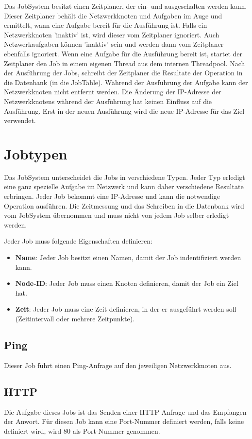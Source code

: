 \documentclass[12pt,a4paper]{report}
\begin{document}
Das JobSystem besitzt einen Zeitplaner, der ein- und ausgeschalten werden kann. Dieser Zeitplaner behält die Netzwerkknoten und Aufgaben im Auge und ermittelt, wann eine Aufgabe bereit für die Ausführung ist. Falls ein Netzwerkknoten 'inaktiv' ist, wird dieser vom Zeitplaner ignoriert. Auch Netzwerkaufgaben können 'inaktiv' sein und werden dann vom Zeitplaner ebenfalls ignoriert. Wenn eine Aufgabe für die Ausführung bereit ist, startet der Zeitplaner den Job in einem eigenen Thread aus dem internen Threadpool. Nach der Ausführung der Jobs, schreibt der Zeitplaner die Resultate der Operation in die Datenbank (in die JobTable). Während der Ausführung der Aufgabe kann der Netzwerkknoten nicht entfernt werden. Die Änderung der IP-Adresse der Netzwerkknotens während der Ausführung hat keinen Einfluss auf die Ausführung. Erst in der neuen Ausführung wird die neue IP-Adresse für das Ziel verwendet.

\section{Jobtypen}

Das JobSystem unterscheidet die Jobs in verschiedene Typen. Jeder Typ erledigt eine ganz spezielle Aufgabe im Netzwerk und kann daher verschiedene Resultate erbringen. Jeder Job bekommt eine IP-Adresse und kann die notwendige Operation ausführen. Die Zeitmessung und das Schreiben in die Datenbank wird vom JobSystem übernommen und muss nicht von jedem Job selber erledigt werden.

Jeder Job muss folgende Eigenschaften definieren:
\begin{itemize}
\item \textbf{Name}: Jeder Job besitzt einen Namen, damit der Job indentifiziert werden kann.
\item \textbf{Node-ID}: Jeder Job muss einen Knoten definieren, damit der Job ein Ziel hat.
\item \textbf{Zeit}: Jeder Job muss eine Zeit definieren, in der er ausgeführt werden soll (Zeitintervall oder mehrere Zeitpunkte).
\end{itemize}

\subsection{Ping} Dieser Job führt einen Ping-Anfrage auf den jeweiligen Netzwerkknoten aus.

\subsection{HTTP} Die Aufgabe dieses Jobs ist das Senden einer HTTP-Anfrage und das Empfangen der Anwort. Für diesen Job kann eine Port-Nummer definiert werden, falls keine definiert wird, wird 80 als Port-Nummer genommen.
\end{document}
